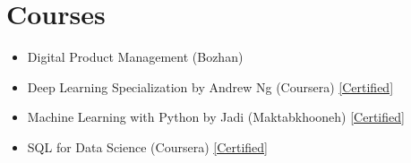 \documentclass[11pt, a4paper]{article}
\newcommand{\resumeItem}[1]{\item\small{#1 \vspace{-2pt}}}
\newcommand{\resumeSubHeadingListStart}{\begin{itemize}[leftmargin=0.15in, label={}]}
\newcommand{\resumeSubHeadingListEnd}{\end{itemize}}
\begin{document}
\section{Courses}
\resumeSubHeadingListStart
    \resumeItem{Digital Product Management (Bozhan)}
    \resumeItem{Deep Learning Specialization by Andrew Ng (Coursera)}{\href{https://www.coursera.org/account/accomplishments/specialization/EN3BD5D7X97H}{[Certified]}}
    \resumeItem{Machine Learning with Python by Jadi (Maktabkhooneh)}{\href{https://maktabkhooneh.org/certificates/MK-KVBCQB/}{[Certified]}}
    \resumeItem{SQL for Data Science (Coursera)}{\href{https://www.coursera.org/account/accomplishments/verify/TLPV567X6MVR}{[Certified]}}
\resumeSubHeadingListEnd
\end{document}
